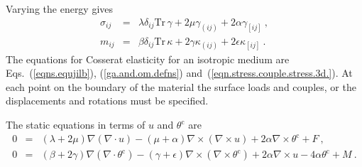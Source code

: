 \documentclass[]{scrreprt}
\newcommand{\si}{\sigma}
\newcommand{\thetac}{\theta^{\mathrm{c}}}
\newcommand{\ep}{\epsilon}
\newcommand{\ga}{\gamma}
\newcommand{\non}{\nonumber}
\newcommand{\de}{\delta}
\newcommand{\ka}{\kappa}
\newcommand{\la}{\lambda}
\newcommand{\tr}{\mbox{Tr}\,}
\newcommand{\al}{\alpha}
\newcommand{\be}{\beta}
\newcommand{\cd}{\cdot}
\begin{document}
Varying the energy gives 
\begin{eqnarray}
\si_{ij} & = & \la\de_{ij}\tr\ga + 2\mu\ga_{(ij)} + 2\al\ga_{[ij]} \ ,
\non \\
m_{ij} & = & \be\de_{ij}\tr\ka + 2\ga\ka_{(ij)} + 2\ep\ka_{[ij]} \ .
\label{eqn.stress.couple.stress.3d.}
\end{eqnarray}
The equations for Cosserat elasticity for an isotropic medium are
Eqs.~(\ref{eqns.equjilb}), (\ref{ga.and.om.defns})
and~(\ref{eqn.stress.couple.stress.3d.}).  At each point on the
boundary of the material the surface loads and couples, or the
displacements and rotations must be specified.

The static equations in terms of $u$ and $\thetac$ are
\begin{eqnarray*}
0 & = & (\la+2\mu)\nabla(\nabla\cd u) -
(\mu+\al)\nabla\times(\nabla\times u) + 2\al\nabla\times\thetac + F
\ , \\
0 & = & (\be+2\ga)\nabla(\nabla\cd\thetac) -
(\ga+\ep)\nabla\times(\nabla\times\thetac) + 2\al\nabla\times u -
4\al\thetac + M \ .
\end{eqnarray*}
\end{document}
